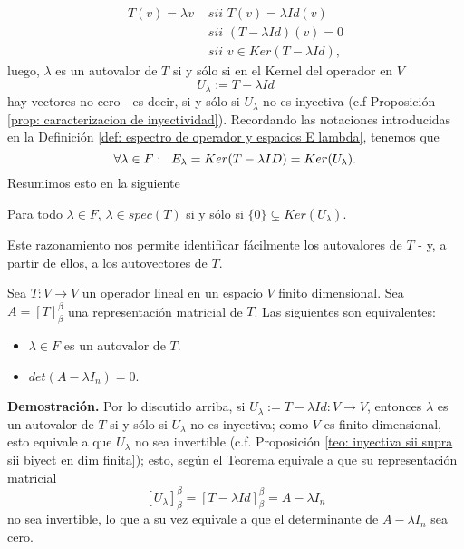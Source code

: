 \begin{align*}
T(v) = \lambda v & \textit{ sii }  T(v) = \lambda Id(v) \\
& \textit{ sii }  (T - \lambda Id )( v ) = 0 \\
& \textit{ sii } v \in Ker(T - \lambda Id),
\end{align*}
luego, $\lambda$ es un autovalor de $T$ si y sólo si
en el Kernel del operador en $V$
$$ U_{\lambda} := T- \lambda Id $$ hay vectores no cero -
es decir, si y sólo si 
$U_{\lambda}$ no es inyectiva
(c.f
Proposición
\ref{prop: caracterizacion de inyectividad}).
Recordando las notaciones introducidas en 
la Definición \ref{def: espectro de operador y espacios E lambda},
tenemos que
\begin{equation}
	\label{eq: espacios de autovectores como Kernel}
	\forall \lambda \in F: \hspace{0.2cm}
	E_{\lambda} = Ker(T- \lambda ID) = Ker(U_{\lambda}).
\end{equation}
Resumimos esto en la siguiente
\begin{obs}
	Para todo $\lambda \in F$, 
	$\lambda \in spec(T)$ si y sólo si
	$\{ 0 \} \subsetneq Ker(U_{\lambda})$.
\end{obs}
Este razonamiento nos permite identificar fácilmente los
autovalores de $T$ - y, a partir de ellos, a los autovectores de $T$.
\begin{prop}
	\label{prop: lambda autovalor sii det cero}
Sea $T: V \longrightarrow V$ un operador lineal en un espacio
$V$ finito dimensional. Sea $A = [T]_{\beta}^{\beta}$ una representación
matricial de $T$. 
Las siguientes son equivalentes:
\begin{itemize}
	\item $\lambda \in F$ es un autovalor de $T$.
	\item $det(A - \lambda I_{n}) = 0$.
\end{itemize}
\end{prop}
\noindent
\textbf{Demostración.}
Por lo discutido arriba, 
si $U_{\lambda} := T - \lambda Id: V \longrightarrow V$, entonces
$\lambda$ es un autovalor de $T$ si y sólo
si $U_{\lambda}$ no es inyectiva; como $V$ es finito dimensional,
esto equivale a que $U_{\lambda}$ no sea invertible 
(c.f. Proposición \ref{teo: inyectiva sii supra sii biyect en dim finita}); 
esto, según el Teorema  equivale a que 
su representación matricial 
\[
[U_{\lambda}]_{\beta}^{\beta} = [T - \lambda Id]_{\beta}^{\beta}
= A - \lambda I_{n}
\]
no sea invertible, lo que a su vez equivale a que 
el determinante de $A - \lambda I_{n}$ sea cero.
\QEDB
\vspace{0.2cm}


